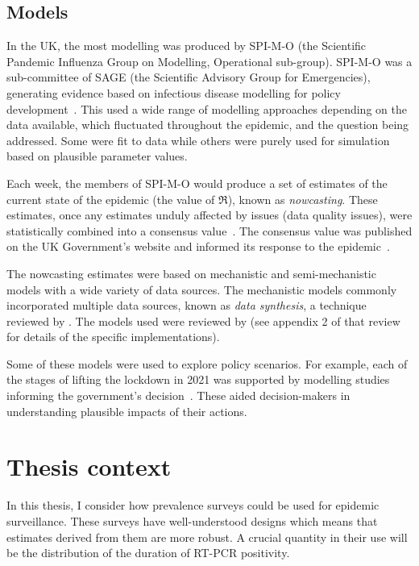 \documentclass[thesis.tex]{subfiles}
\begin{document}
\subsection{Models}

In the UK, the most modelling was produced by SPI-M-O (the Scientific Pandemic Influenza Group on Modelling, Operational sub-group).
SPI-M-O was a sub-committee of SAGE (the Scientific Advisory Group for Emergencies), generating evidence based on infectious disease modelling for policy development~\autocite{medleySPIM,govSPIMO}.
This used a wide range of  modelling approaches depending on the data available, which fluctuated throughout the epidemic, and the question being addressed.
Some were fit to data while others were purely used for simulation based on plausible parameter values.

Each week, the members of SPI-M-O would produce a set of estimates of the current state of the epidemic (\eg the value of $\Re$), known as \emph{nowcasting}.
These estimates, once any estimates unduly affected by issues (\eg data quality issues), were statistically combined into a consensus value~\autocite{parkCombining}.
The consensus value was published on the UK Government's website and informed its response to the epidemic~\autocite{govRnumber}.

The nowcasting estimates were based on mechanistic and semi-mechanistic models with a wide variety of data sources.
The mechanistic models commonly incorporated multiple data sources, known as \emph{data synthesis}, a technique reviewed by \textcite{birrellEvidence}.
The models used were reviewed by \textcite{royalSocietyRnumber} (see appendix 2 of that review for details of the specific implementations).

Some of these models were used to explore policy scenarios.
For example, each of the stages of lifting the lockdown in 2021 was supported by modelling studies informing the government's decision~\autocite{sageEvidence}.
These aided decision-makers in understanding plausible impacts of their actions.

\section{Thesis context}

In this thesis, I consider how prevalence surveys could be used for epidemic surveillance.
These surveys have well-understood designs which means that estimates derived from them are more robust.
A crucial quantity in their use will be the distribution of the duration of RT-PCR positivity.
\end{document}
